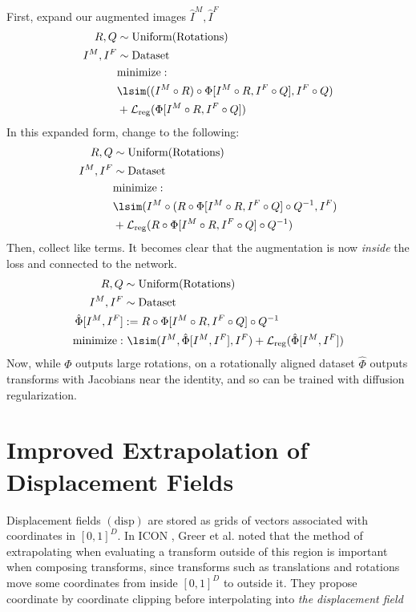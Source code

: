 First, expand our augmented images $\hat{I}^M, \hat{I}^F$
\begin{align}
    R, Q &\sim \text{Uniform}(\text{Rotations}) \nonumber \\
    I^M, I^F &\sim \text{Dataset} \nonumber \\
    &\text{minimize}:  \nonumber \\
    &\lsim((I^M \circ R) \circ \Phi[I^M \circ R, I^F \circ Q], I^F \circ Q) \nonumber \\
    &+ \mathcal{L}_\text{reg}(\Phi[I^M \circ R, I^F \circ Q])
\end{align}
In this expanded form, change to the following:
\begin{align}
    R, Q &\sim \text{Uniform}(\text{Rotations}) \nonumber \\
    I^M, I^F &\sim \text{Dataset} \nonumber \\
    &\text{minimize}:  \nonumber \\
    &\lsim(I^M \circ (R \circ \Phi[I^M \circ R, I^F \circ Q] \circ Q^{-1}, I^F) \nonumber \\
    &+ \mathcal{L}_\text{reg}(R \circ \Phi[I^M \circ R, I^F \circ Q] \circ Q^{-1})
\end{align}
Then, collect like terms. It becomes clear that the augmentation is now \emph{inside} the loss and connected to the network. 
\begin{align}
    R, Q &\sim \text{Uniform}(\text{Rotations}) \nonumber \\
    I^M, I^F &\sim \text{Dataset} \nonumber \\
    \hat{\Phi}[I^M, I^F] &:= R \circ \Phi[I^M \circ R, I^F \circ Q] \circ Q^{-1} \\   
    \text{minimize}:& ~\lsim(I^M, \hat{\Phi}[I^M, I^F], I^F) + \mathcal{L}_\text{reg}(\hat{\Phi}[I^M, I^F]) \nonumber
\end{align}
Now, while $\Phi$ outputs large rotations, on a rotationally aligned dataset $\hat{\Phi}$ outputs transforms with Jacobians near the identity, and so can be trained with diffusion regularization.

\section{Improved Extrapolation of Displacement Fields}
\label{sec:improved_extrapolation}

Displacement fields $(\text{disp})$ are stored as grids of vectors associated with coordinates in $[0, 1]^D$. In ICON \cite{greer2021icon}, Greer et al. noted that the method of extrapolating when evaluating a transform outside of this region is important when composing transforms, since transforms such as translations and rotations move some coordinates from inside $[0, 1]^D$ to outside it. They propose coordinate by coordinate clipping before interpolating into  \emph{the displacement field}

